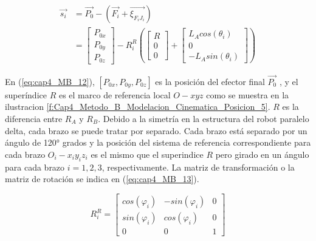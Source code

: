     \begin{align}
        \overrightarrow{s_{i}} & = \overrightarrow{P_{0}}- \left(\overrightarrow{F_{i}}+\overrightarrow{\xi_{F_{i}J_{i}}} \right)\\&= 
            \begin{bmatrix}
                P_{0x} \\
                P_{0y} \\
                P_{0z}
            \end{bmatrix} -  R_{i}^{R}
            \left( 
            \begin{bmatrix}
                R \\
                0\\
                0
            \end{bmatrix} + 
            \begin{bmatrix}
                L_{A} cos(\theta_i) \\
                0\\
                -L_{A} sin(\theta_i) 
            \end{bmatrix}
            \right)
        \label{eq:cap4_MB_12}
    \end{align}
    
    En (\ref{eq:cap4_MB_12}), $[P_{0x},P_{0y},P_{0z}]$ es la posición del efector final $\overrightarrow{P_{0}}$ , y el superíndice $R$ es el marco de referencia local $O-xyz$ como se muestra en la ilustracion \ref{f:Cap4_Metodo_B_Modelacion_Cinematica_Posicion_5}. $R$ es la diferencia entre ${R}_{A}$ y ${R}_{B}$.
    Debido a la simetría en la estructura del robot paralelo delta, cada brazo se puede tratar por separado. Cada brazo está separado por un ángulo de 120° grados y la posición del sistema de referencia correspondiente para cada brazo $O_i - x_i y_i z_i$  es el mismo que el superindice $R$ pero girado en un ángulo para cada brazo $i={1,2 ,3}$, respectivamente. 
    La matriz de transformación  o  la  matriz de rotación se indica en (\ref{eq:cap4_MB_13}).
    
       \begin{equation}
         R_{i}^{R} =
        \begin{bmatrix}
                cos(\varphi_i)&-sin(\varphi_i)&0 \\
                sin(\varphi_i)&cos(\varphi_i)&0 \\
                0&0&1
            \end{bmatrix}
        \label{eq:cap4_MB_13}
    \end{equation}  
    

